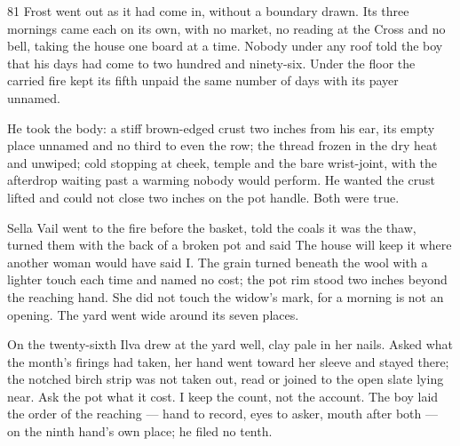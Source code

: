 
\scenebreak


\scenebreak


\scenebreak

\CRtailpiece
\begin{CRchronicle}{81}
Frost went out as it had come in, without a boundary drawn. Its three mornings came each on its own, with no market, no reading at the Cross and no bell, taking the house one board at a time. Nobody under any roof told the boy that his days had come to two hundred and ninety-six. Under the floor the carried fire kept its fifth unpaid the same number of days with its payer unnamed.

He took the body: a stiff brown-edged crust two inches from his ear, its empty place unnamed and no third to even the row; the thread frozen in the dry heat and unwiped; cold stopping at cheek, temple and the bare wrist-joint, with the afterdrop waiting past a warming nobody would perform. He wanted the crust lifted and could not close two inches on the pot handle. Both were true.

Sella Vail went to the fire before the basket, told the coals it was the thaw, turned them with the back of a broken pot and said The house will keep it where another woman would have said I. The grain turned beneath the wool with a lighter touch each time and named no cost; the pot rim stood two inches beyond the reaching hand. She did not touch the widow’s mark, for a morning is not an opening. The yard went wide around its seven places.

On the twenty-sixth Ilva drew at the yard well, clay pale in her nails. Asked what the month’s firings had taken, her hand went toward her sleeve and stayed there; the notched birch strip was not taken out, read or joined to the open slate lying near. Ask the pot what it cost. I keep the count, not the account. The boy laid the order of the reaching --- hand to record, eyes to asker, mouth after both --- on the ninth hand’s own place; he filed no tenth.


\end{CRchronicle}
